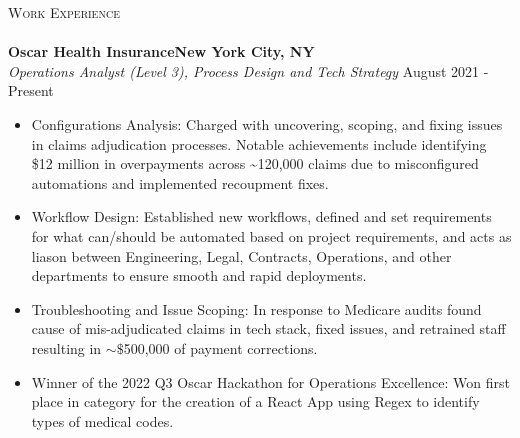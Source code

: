 \documentclass[a4paper]{article}
\newcommand{\lineunder} {
    \vspace*{-8pt} \\
    \hspace*{-18pt} \hrulefill \\
}
\newcommand{\header} [1] {
    {\hspace*{-18pt}\vspace*{6pt} \textsc{#1}}
    \vspace*{-6pt} \lineunder
}
\begin{document}
\header{Work Experience}
\vspace{1mm}
\textbf{Oscar Health Insurance\hfill New York City, NY}\\
\textit{Operations Analyst (Level 3), Process Design and Tech Strategy} \hfill August 2021 - Present\\
\vspace{-1mm}
\begin{itemize} \itemsep 1pt
    \item Configurations Analysis: Charged with uncovering, scoping, and fixing issues in claims adjudication processes. 
        Notable achievements include identifying \$12 million in overpayments across \textasciitilde{}120,000 claims due to misconfigured automations and implemented recoupment fixes.

    \item   Workflow Design: Established new workflows, defined and set requirements for what can/should be automated based on project requirements,
     and acts as liason between Engineering, Legal, Contracts, Operations, and other departments to ensure smooth and rapid deployments.
     \item 	Troubleshooting and Issue Scoping: In response to Medicare audits found cause of mis-adjudicated claims in tech stack, fixed issues, and retrained staff
     resulting in $\sim \$$500,000 of payment corrections.

     \item Winner of the 2022 Q3 Oscar Hackathon for Operations Excellence: Won first place in category for the creation of a React App using Regex to identify types of medical codes.
\end{itemize}
\end{document}
